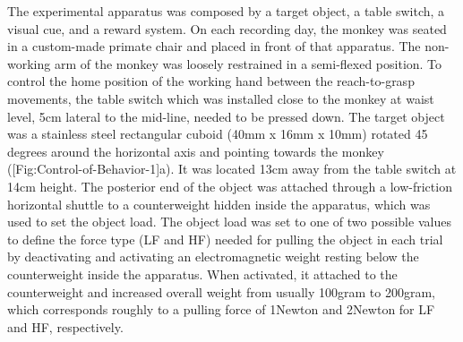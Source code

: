 The experimental apparatus was composed by a target object, a table switch, a visual cue, and a reward system. On each recording day, the monkey was seated in a custom-made primate chair and placed in front of that apparatus. The non-working arm of the monkey was loosely restrained in a semi-flexed position. To control the home position of the working hand between the reach-to-grasp movements, the table switch which was installed close to the monkey at waist level, 5cm lateral to the mid-line, needed to be pressed down. The target object was a stainless steel rectangular cuboid (40mm x 16mm x 10mm) rotated 45 degrees around the horizontal axis and pointing towards the monkey ([Fig:Control-of-Behavior-1]a). It was located 13cm away from the table switch at 14cm height. The posterior end of the object was attached through a low-friction horizontal shuttle to a counterweight hidden inside the apparatus, which was used to set the object load. The object load was set to one of two possible values to define the force type (LF and HF) needed for pulling the object in each trial by deactivating and activating an electromagnetic weight resting below the counterweight inside the apparatus. When activated, it attached to the counterweight and increased overall weight from usually 100gram to 200gram, which corresponds roughly to a pulling force of 1Newton and 2Newton for LF and HF, respectively. 

